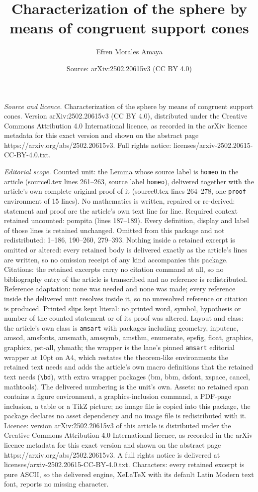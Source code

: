 \documentclass[10pt,a4paper]{amsart}
\title[Characterization of the sphere by means of congruent support]{Characterization of the sphere by means of congruent support cones}
\author{Efren Morales Amaya}
\date{Source: arXiv:2502.20615v3 (CC BY 4.0)}
\begin{document}
\maketitle

\noindent\emph{Source and licence.} Characterization of the sphere by means of congruent support cones. Version arXiv:2502.20615v3 (CC BY 4.0), distributed under the Creative Commons Attribution 4.0 International licence, as recorded in the arXiv licence metadata for this exact version and shown on the abstract page https://arxiv.org/abs/2502.20615v3. Full rights notice: licenses/arxiv-2502.20615-CC-BY-4.0.txt.\par\smallskip

\noindent\textit{Editorial scope.} Counted unit: the Lemma whose source label is \texttt{homeo} in the article (source0.tex lines 261--263, source label \texttt{homeo}), delivered together with the article's own complete original proof of it (source0.tex lines 264--278, one \texttt{proof} environment of 15 lines). No mathematics is written, repaired or re-derived: statement and proof are the article's own text line for line. Required context retained uncounted: pompita (lines 187--189). Every definition, display and label of those lines is retained unchanged. Omitted from this package and not redistributed: 1--186, 190--260, 279--393. Nothing inside a retained excerpt is omitted or altered: every retained body is delivered exactly as the article's lines are written, so no omission receipt of any kind accompanies this package. Citations: the retained excerpts carry no citation command at all, so no bibliography entry of the article is transcribed and no reference is redistributed. Reference adaptation: none was needed and none was made; every reference inside the delivered unit resolves inside it, so no unresolved reference or citation is produced. Printed slips kept literal: no printed word, symbol, hypothesis or number of the counted statement or of its proof was altered. Layout and class: the article's own class is \texttt{amsart} with packages including geometry, inputenc, amscd, amsfonts, amsmath, amssymb, amsthm, enumerate, epsfig, float, graphics, graphicx, pst-all, yhmath; the wrapper is the lane's pinned \texttt{amsart} editorial wrapper at 10pt on A4, which restates the theorem-like environments the retained text needs and adds the article's own macro definitions that the retained text needs (\texttt{\textbackslash bd}), with extra wrapper packages (bm, bbm, dsfont, xspace, cancel, mathtools). The delivered numbering is the unit's own. Assets: no retained span contains a figure environment, a graphics-inclusion command, a PDF-page inclusion, a table or a TikZ picture; no image file is copied into this package, the package declares no asset dependency and no image file is redistributed with it. Licence: version arXiv:2502.20615v3 of this article is distributed under the Creative Commons Attribution 4.0 International licence, as recorded in the arXiv licence metadata for this exact version and shown on the abstract page https://arxiv.org/abs/2502.20615v3. A full rights notice is delivered at licenses/arxiv-2502.20615-CC-BY-4.0.txt. Characters: every retained excerpt is pure ASCII, so the delivered engine, XeLaTeX with its default Latin Modern text font, reports no missing character.
\end{document}
